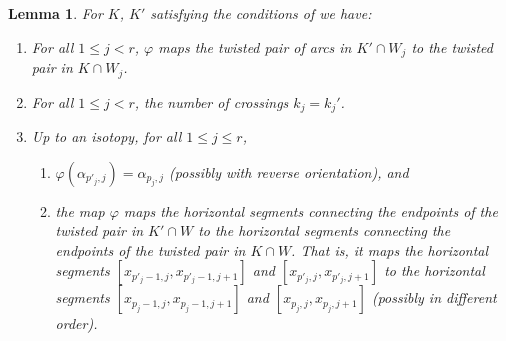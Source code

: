 \documentclass[12pt,reqno]{amsart}
\theoremstyle{plain}
\newtheorem{lemma}[theorem]{Lemma}
\theoremstyle{definition}
\begin{document}
\begin{lemma}\label{lem: twists between consecutive} For $K$, $K'$ satisfying the conditions of 
 we have:
\begin{enumerate}

\item For all $1\le j <r$, $\varphi$ maps the twisted pair of arcs in $K'\cap W_j$ 
to the twisted pair in $K\cap W_j$.

\item  For all $1\le j <r$, the number of crossings $k_j = k_j'$.

\item Up to an isotopy, for all $1\le j \le r$, 

\begin{enumerate}[label = (3\alph*)]
    \item  $\varphi(\alpha_{p'_j,j})=\alpha_{p_j,j}$ (possibly with reverse 
    orientation), and 
    
    \item the map $\varphi$ maps the horizontal segments connecting the endpoints of the 
    twisted pair in $K'\cap W$ to the horizontal segments connecting the endpoints 
    of the twisted pair in $K\cap W$. That is, it maps the horizontal segments 
    $[x_{p'_j-1,j}, x_{p'_j-1,j+1}]$ and $[x_{p'_j,j},x_{p'_j,j+1}]$ to the
    horizontal segments $[x_{p_j-1,j}, x_{p_j-1,j+1}]$ and $[x_{p_j,j},x_{p_j,j+1}]$ 
    (possibly in different order).
\end{enumerate}
\end{enumerate}
\end{lemma}
\end{document}
